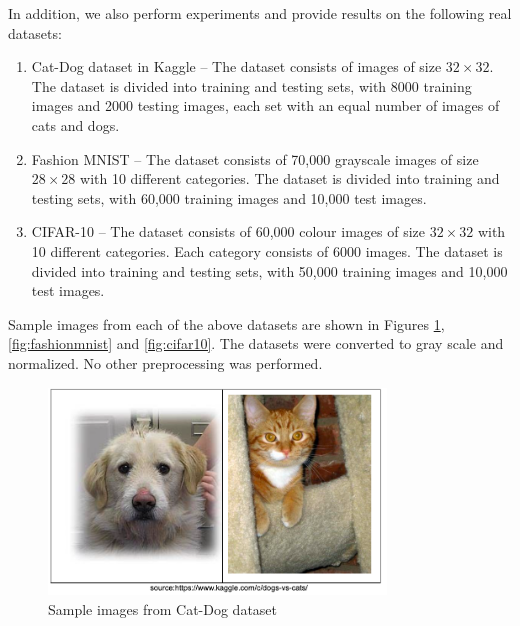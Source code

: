 \documentclass[wcp]{jmlr}
\begin{document}
In addition, we also perform experiments and provide results on the following real datasets:
\begin{enumerate}
\item Cat-Dog dataset in Kaggle -- The dataset consists of  images of size $32 \times 32$. The dataset is divided into training and testing sets, with 8000 training images and 2000 testing images,  each set with an equal number of images of cats and dogs.
\item Fashion MNIST -- The dataset consists of 70,000 grayscale images of size $28 \times 28$ with 10 different categories. The dataset is divided into training and testing sets, with 60,000 training images and 10,000 test images.
\item CIFAR-10 -- The dataset consists of 60,000 colour images of size $32 \times 32$ with 10 different categories. Each category consists of 6000 images. The dataset is divided into training and testing sets, with 50,000 training images and 10,000 test images.
\end{enumerate}

Sample images from each of the above datasets are shown in Figures \ref{fig:catdog},  \ref{fig:fashionmnist}  and  \ref{fig:cifar10}. The datasets were converted to gray scale and normalized. No other preprocessing was performed.

\begin{figure}[htp]
\begin{center}
\includegraphics[width=0.8\textwidth]{images/catdog.png}
\caption{Sample images from Cat-Dog dataset}\label{fig:catdog}
\end{center}
\end{figure}
\end{document}
